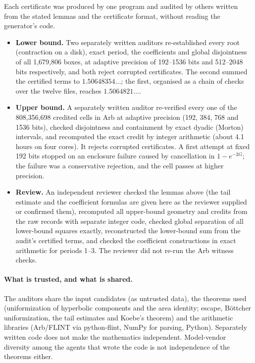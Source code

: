 \documentclass[11pt]{article}
\begin{document}
Each certificate was produced by one program and audited by others written from the stated lemmas and the certificate format, without reading the generator's code.
\begin{itemize}
\item \textbf{Lower bound.} Two separately written auditors re-established every root (contraction on a disk), exact period, the coefficients and global disjointness of all 1,679,806 boxes, at adaptive precision of 192--1536 bits and 512--2048 bits respectively, and both reject corrupted certificates. The second summed the certified terms to $1.50648354\ldots$; the first, organised as a chain of checks over the twelve files, reaches $1.5064821\ldots$.
\item \textbf{Upper bound.} A separately written auditor re-verified every one of the 808,356,698 credited cells in Arb at adaptive precision (192, 384, 768 and 1536 bits), checked disjointness and containment by exact dyadic (Morton) intervals, and recomputed the exact credit by integer arithmetic (about 4.1 hours on four cores). It rejects corrupted certificates. A first attempt at fixed 192 bits stopped on an enclosure failure caused by cancellation in $1-e^{-2G}$; the failure was a conservative rejection, and the cell passes at higher precision.
\item \textbf{Review.} An independent reviewer checked the lemmas above (the tail estimate and the coefficient formulas are given here as the reviewer supplied or confirmed them), recomputed all upper-bound geometry and credits from the raw records with separate integer code, checked global separation of all lower-bound squares exactly, reconstructed the lower-bound sum from the audit's certified terms, and checked the coefficient constructions in exact arithmetic for periods 1--3. The reviewer did not re-run the Arb witness checks.
\end{itemize}

\paragraph{What is trusted, and what is shared.} The auditors share the input candidates (as untrusted data), the theorems used (uniformization of hyperbolic components and the area identity; escape, B\"ottcher uniformization, the tail estimates and Koebe's theorem) and the arithmetic libraries (Arb/FLINT via python-flint, NumPy for parsing, Python). Separately written code does not make the mathematics independent. Model-vendor diversity among the agents that wrote the code is not independence of the theorems either.
\end{document}
